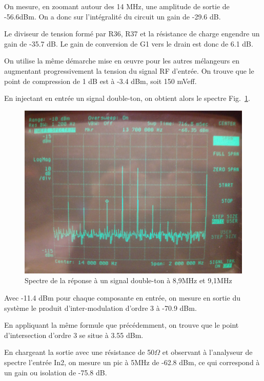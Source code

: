 \documentclass{article}
\begin{document}
On mesure, en zoomant autour des 14 MHz, une amplitude de sortie de -56.6dBm. On a donc sur l'intégralité du circuit un gain de -29.6 dB.

Le diviseur de tension formé par R36, R37 et la résistance de charge engendre un gain de -35.7 dB. Le gain de conversion de G1 vers le drain est donc de 6.1 dB.



On utilise la même démarche mise en œuvre pour les autres mélangeurs en augmentant progressivement la tension du signal RF d'entrée.
On trouve que le point de compression de 1 dB est à -3.4 dBm, soit 150 mVeff.



En injectant en entrée un signal double-ton, on obtient alors le spectre Fig.~\ref{fig:10_3_4}.

\begin{figure}[h!]
	\centering
	\includegraphics[width=.7\textwidth]{10_3_4}
	\caption{Spectre de la réponse à un signal double-ton à 8,9MHz et 9,1MHz}
	\label{fig:10_3_4}
\end{figure}

Avec -11.4 dBm pour chaque composante en entrée, on mesure en sortie du système le produit d'inter-modulation d'ordre 3 à -70.9 dBm.

En appliquant la même formule que précédemment, on trouve que le point d'intersection d'ordre 3 se situe à 3.55 dBm.



En chargeant la sortie avec une résistance de 50$\Omega$ et observant à l'analyseur de spectre l'entrée In2, on mesure un pic à 5MHz de -62.8 dBm, ce qui correspond à un gain ou isolation de -75.8 dB.


%
%
%
%
\end{document}
